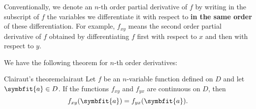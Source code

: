 \documentclass[math]{amznotes}
\theoremstyle{remark}
\begin{document}
Conventionally, we denote an $n$-th order partial derivative of $f$ by writing in the subscript of $f$ the variables we differentiate it with respect to {\color{red} \textbf{in the same order}} of these differentiation. For example, $f_{xy}$ means the second order partial derivative of $f$ obtained by differentiating $f$ first with respect to $x$ and then with respect to $y$.

We have the following theorem for $n$-th order derivatives:
\begin{thmbox}{Clairaut's theorem}{clairaut}
    Let $f$ be an $n$-variable function defined on $D$ and let $\symbfit{a} \in D$. If the functions $f_{xy}$ and $f_{yx}$ are continuous on $D$, then
    \begin{equation*}
        f_{xy}(\symbfit{a}) = f_{yx}(\symbfit{a}).
    \end{equation*}
\end{thmbox}
\end{document}
